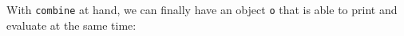 With \lstinline{combine} at hand, we can finally have an object \lstinline{o}
that is able to print and evaluate at the same time:



\begin{comment}
which is of type
\lstinline{Exp}, to \lstinline{sub}, which expects a value of type
\lstinline{ExtExp}. This works precisely because \lstinline{Exp} is a
\textit{subtype} of \lstinline{ExtExp}. An acute reader by now may find an issue
about code reuse, i.e., we cannot reuse constructors! For example, the following
is rejected:
Instead, \lstinline{e3} should be written as follow:
Although, admittedly, creating expressions like this is slightly more
cumbersome. 
\end{comment}


\begin{comment}
The combinator is defined by the \lstinline{combine} trait, which takes two
algebras to create a combined algebra. It does so by appropriately delegating
behaviours in each component algebra to the combined algebra.


\bruno{Well, the previous subsection already introduces parametric
  polymorphism, so this discussion comes too late!}
Something new appears the above trait declaration. \name supports parametric
polymorphism. In \name, type variables use uppercase letters. Following the work
of~\citet{alpuimdisjoint}, \name uses an extension to universal quantification
called \textit{disjoint quantification}, where a type variable can be
constrained so that it is disjoint with a given type (\lstinline{B * A} for
example). Parametric polymorphism is need because \lstinline{combine} must
compose algebras with arbitrary type parameters. A disjointness constraint is
needed to ensure that two input algebras build values of disjoint types
(otherwise ambiguity could arise).
\end{comment}

\begin{comment}
\paragraph{Data constructors.} Using \lstinline{Exp} the two data constrcutors
are defined as follows:
\end{comment}

